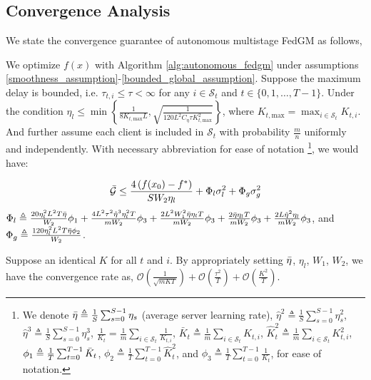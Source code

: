 \subsection{Convergence Analysis}

We state the convergence guarantee of autonomous multistage FedGM as follows,

\begin{theorem}
\label{multistage_fedgm_free_uniform_arrival_convergence_theorem}
We optimize $f(x)$ with Algorithm \ref{alg:autonomous_fedgm} under assumptions \ref{smoothness_assumption}-\ref{bounded_global_assumption}. Suppose the maximum delay is bounded, i.e. $\tau_{t,i}\leq\tau<\infty$ for any $i\in\mathcal{S}_t$ and $t\in\{0,1,\dots,T-1\}$. Under the condition $\eta_l\leq\min\left\{\frac{1}{8K_{t,\text{max}}L},\sqrt{\frac{1}{ 120L^2 C_\eta \tau K_{t,\text{max}}^2}} \right\}$, where $K_{t,\text{max}} =\max_{i\in\mathcal{S}_t}K_{t,i} $. And further assume each client is included in $\mathcal{S}_t$ with probability $\frac{m}{n}$ uniformly and independently. With necessary abbreviation for ease of notation \footnote{We denote $\Bar{\eta}\triangleq\frac{1}{S}\sum_{s=0}^{S-1}\eta_s$ (average server learning rate), $\hat{\eta}^2\triangleq\frac{1}{S}\sum_{s=0}^{S-1}\eta^2_s$, $\hat{\eta}^3\triangleq\frac{1}{S}\sum_{s=0}^{S-1}\eta^3_s$, $\frac{1}{K_t}=\frac{1}{m}\sum_{i\in\mathcal{S}_t}\frac{1}{K_{t,i}}$, $\bar{K}_t\triangleq \frac{1}{m}\sum_{i\in\mathcal{S}_t}K_{t,i}$, $\hat{K}_t^2 \triangleq \frac{1}{m}\sum_{i\in\mathcal{S}_t}K^2_{t,i}$, $\phi_1 \triangleq  \frac{1}{T}\sum_{t=0}^{T-1} \Bar{K}_t$, $\phi_2 \triangleq  \frac{1}{T}\sum_{t=0}^{T-1} \hat{K}_t^2$, and $\phi_3 \triangleq \frac{1}{T}\sum_{t=0}^{T-1} \frac{1}{K_t}$, for ease of notation.}, we would have:

\begin{gather*}
 \Bar{\mathcal{G}}
\leq \frac{4 \left(f(x_0) - f^\ast  \right)}{S W_2 \eta_l} 
+  \Phi_l \sigma_l^2
+ \Phi_g \sigma_g^2 
\label{multistage_fedgm_free_uniform_arrival_bound}
\end{gather*}
$\Phi_l \triangleq \frac{20  \eta^2_l L^2 T \Bar{\eta}}{W_2} \phi_1 + \frac{4 L^2\tau^2\hat{\eta}^3\eta_l^2T}{mW_2}\phi_3 + \frac{2 L^2W_1^2 \Bar{\eta} \eta_l T}{m W_2}\phi_3 + \frac{2 \Bar{\eta} \eta_l T}{m W_2}\phi_3 + \frac{2 L\hat{\eta}^2\eta_l}{m W_2}\phi_3$, and $\Phi_g \triangleq \frac{120 \eta^2_l L^2 T \Bar{\eta} \phi_2}{W_2}$. 
\end{theorem}



\begin{corollary}
Suppose an identical $K$ for all $t$ and $i$. By appropriately setting $\Bar{\eta}$, $\eta_l$, $W_1$, $W_2$, we have the convergence rate as, $\mathcal{O}\left(\frac{1}{\sqrt{mKT}}\right)+ \mathcal{O}\left(\frac{\tau^2}{T}\right) +  \mathcal{O}\left( \frac{K^2}{T} \right)$.
\label{corollary:free_multistage_fedgm_rate}
\end{corollary}


